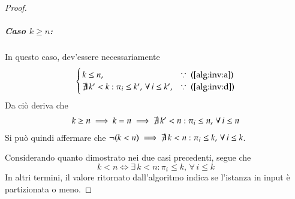 \documentclass[../../../relazione.tex]{subfiles}
\begin{document}
\begin{proof}
    \subparagraph{Caso $k \geq n$:}
    In questo caso, dev'essere necessariamente
    \begin{equation*}
        \begin{cases}
            k \leq n \mbox{,}                                                    & \because \mbox{ (\ref{alg:inv:a})} \\
            \not\exists\, k' < k : \pi_i \leq k',\, \forall\, i \leq k' \mbox{,} & \because \mbox{ (\ref{alg:inv:d})}
        \end{cases}
    \end{equation*}
    Da ciò deriva che
    \begin{align*}
        k \geq n \implies k = n  \implies \not\exists\, k' < n : \pi_i \leq n,\, \forall\, i \leq n
    \end{align*}
    Si può quindi affermare che $\neg(k < n) \implies \not\exists\, k < n : \pi_i \leq k,\, \forall\, i \leq k$.

    Considerando quanto dimostrato nei due casi precedenti, segue che
    \[ k < n \iff \exists\, k < n : \pi_i \leq k,\, \forall\, i \leq k \]
    In altri termini, il valore ritornato dall'algoritmo indica se l'istanza in input è partizionata o meno.

\end{proof}
\end{document}

